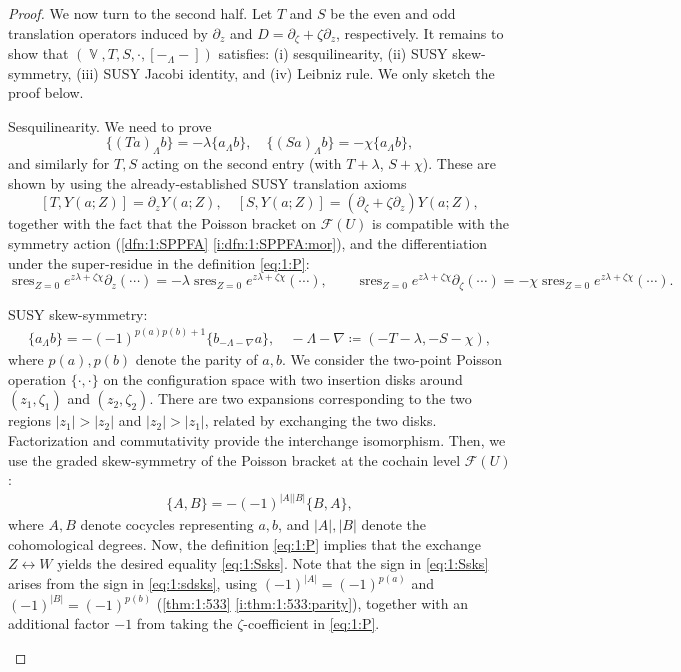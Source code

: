 \documentclass[final,reqno]{amsart}
\numberwithin{equation}{section}
\theoremstyle{definition}
\newcommand{\ceq}{\coloneqq} %
\newcommand{\clF}{\mathcal{F}}
\newcommand{\pd}{\partial}
\newcommand{\abs}[1]{\left| #1 \right|}
\DeclareMathOperator{\bbV}{\mathbb{V}}
\DeclareMathOperator*{\sres}{sres}
\begin{document}
\begin{proof}
\medskip

We now turn to the second half.
Let $T$ and $S$ be the even and odd translation operators induced by 
$\pd_z$ and $D=\pd_\zeta+\zeta\pd_z$, respectively.
It remains to show that $(\bbV,T,S,\cdot,[-_\Lambda-])$ satisfies:
(i) sesquilinearity,
(ii) SUSY skew-symmetry,
(iii) SUSY Jacobi identity, and
(iv) Leibniz rule.
We only sketch the proof below.
\begin{clist}
\item 
Sesquilinearity. 
We need to prove 
\[
 \{(Ta)_\Lambda b\} = -\lambda\{a_\Lambda b\}, \quad 
 \{(Sa)_\Lambda b\} = -\chi   \{a_\Lambda b\},
\]
and similarly for $T,S$ acting on the second entry 
(with $T+\lambda$, $S+\chi$). 
These are shown by using the already-established SUSY translation axioms 
\[
 [T,Y(a;Z)] = \pd_z Y(a;Z), \quad 
 [S,Y(a;Z)] = (\pd_\zeta+\zeta\pd_z)Y(a;Z),
\]
together with the fact that the Poisson bracket on $\clF(U)$ 
is compatible with the symmetry action 
(\cref{dfn:1:SPPFA} \ref{i:dfn:1:SPPFA:mor}), 
and the differentiation under the super-residue 
in the definition \eqref{eq:1:P}:
\[
 \sres_{Z=0} e^{z\lambda+\zeta\chi}\pd_z(\cdots) = 
-\lambda \sres_{Z=0} e^{z\lambda+\zeta\chi}(\cdots), \qquad
 \sres_{Z=0} e^{z\lambda+\zeta\chi}\pd_\zeta(\cdots) = 
-\chi \sres_{Z=0} e^{z\lambda+\zeta\chi}(\cdots).
\]

\item 
SUSY skew-symmetry: 
\begin{align}\label{eq:1:Ssks}
 \{a_\Lambda b\} = -(-1)^{p(a) p(b) + 1} \{b_{-\Lambda-\nabla}a\}, \quad 
 -\Lambda-\nabla\ceq(-T-\lambda,-S-\chi),
\end{align}
where $p(a),p(b)$ denote the parity of $a,b$.
We consider the two-point Poisson operation $\{\cdot,\cdot\}$ 
on the configuration space with two insertion disks around 
$(z_1,\zeta_1)$ and $(z_2,\zeta_2)$.
There are two expansions corresponding to the two regions 
$|z_1|>|z_2|$ and $|z_2|>|z_1|$, related by exchanging the two disks.
Factorization and commutativity provide the interchange isomorphism. 
Then, we use the graded skew-symmetry 
of the Poisson bracket at the cochain level $\clF(U)$:
\begin{align}\label{eq:1:sdsks}
 \{A,B\}=-(-1)^{\abs{A} \abs{B}}\{B,A\},
\end{align}
where $A,B$ denote cocycles representing $a,b$, and 
$\abs{A},\abs{B}$ denote the cohomological degrees.
Now, the definition \eqref{eq:1:P} implies that the exchange 
$Z \leftrightarrow W$ yields the desired equality \eqref{eq:1:Ssks}.
Note that the sign in \eqref{eq:1:Ssks} arises from 
the sign in \eqref{eq:1:sdsks}, using $(-1)^{\abs{A}}=(-1)^{p(a)}$ and 
$(-1)^{\abs{B}}=(-1)^{p(b)}$ (\cref{thm:1:533} \ref{i:thm:1:533:parity}),  
together with an additional factor $-1$ from 
taking the $\zeta$-coefficient in \eqref{eq:1:P}.


\end{clist}
\end{proof}
\end{document}
